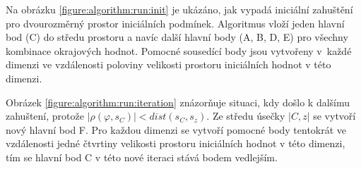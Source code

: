 Na obrázku \ref{figure:algorithm:run:init} je ukázáno, jak vypadá iniciální zahuštění
pro dvourozměrný prostor iniciálních podmínek. Algoritmus vloží jeden hlavní bod (C) do středu prostoru
a navíc další hlavní body (A, B, D, E) pro všechny kombinace okrajových hodnot. Pomocné sousedící body
jsou vytvořeny v~každé dimenzi ve vzdálenosti poloviny velikosti prostoru iniciálních hodnot
v této dimenzi.

Obrázek \ref{figure:algorithm:run:iteration} znázorňuje situaci, kdy došlo k dalšímu zahuštení,
pro\-tože $\big|\rho(\varphi, s_C)\big| < dist(s_C, s_z)$. Ze středu úsečky $|C,z|$ se vytvoří
nový hlavní bod F. Pro každou dimenzi se vytvoří pomocné body tentokrát ve vzdá\-le\-nosti jedné čtvrtiny
velikosti prostoru iniciálních hodnot v této dimenzi, tím se hlavní bod C v této nové iteraci stává bodem
vedlejším.
